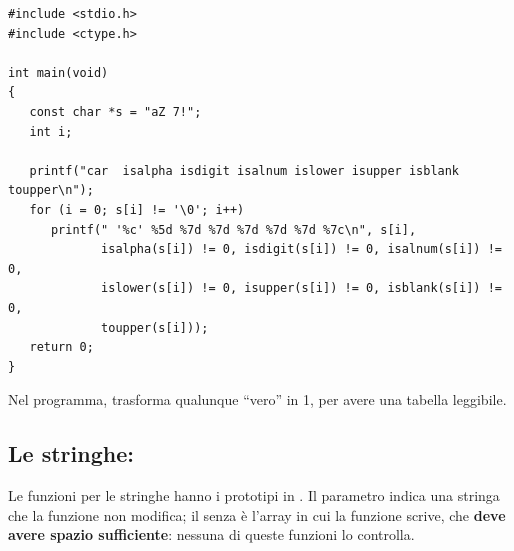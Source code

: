 \begin{lstlisting}[style=c, name=ctipi.c]
#include <stdio.h>
#include <ctype.h>

int main(void)
{
   const char *s = "aZ 7!";
   int i;

   printf("car  isalpha isdigit isalnum islower isupper isblank toupper\n");
   for (i = 0; s[i] != '\0'; i++)
      printf(" '%c' %5d %7d %7d %7d %7d %7d %7c\n", s[i],
             isalpha(s[i]) != 0, isdigit(s[i]) != 0, isalnum(s[i]) != 0,
             islower(s[i]) != 0, isupper(s[i]) != 0, isblank(s[i]) != 0,
             toupper(s[i]));
   return 0;
}
\end{lstlisting}


Nel programma,  trasforma qualunque “vero” in 1, per avere una
tabella leggibile.

\subsection{Le stringhe: }

Le funzioni per le stringhe hanno i prototipi in . Il
parametro  indica una stringa che la funzione non
modifica; il  senza  è l'array in cui la funzione
scrive, che \textbf{deve avere spazio sufficiente}: nessuna di queste
funzioni lo controlla.

